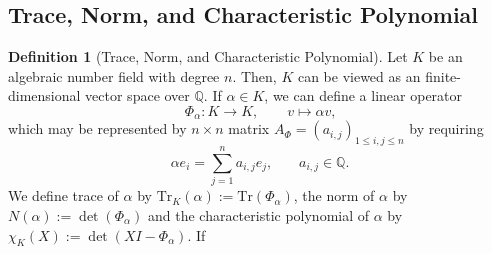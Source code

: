 \documentclass[a4paper]{book}
\theoremstyle{definition}
\newtheorem{definition}{Definition}[]
\begin{document}
\subsection{Trace, Norm, and Characteristic Polynomial}

\begin{defbox}
    \begin{definition}[Trace, Norm, and Characteristic Polynomial]
        Let \(K\) be an {\color{mathif}algebraic number field} with {\color{mathif}degree} \(n\). Then, \(K\) can be viewed as an {\color{mathif}finite-dimensional vector space} over \(\mathbb{Q}\). If \(\alpha \in K\), we can define a {\color{mathif}linear operator}
        \begin{equation*}
            \Phi_\alpha: K \longrightarrow K, \qquad v \mapsto \alpha v \text{,}
        \end{equation*}
        which may be represented by \(n \times n\) {\color{mathif}matrix} \(A_\Phi = (a_{i, j})_{1 \leq i, j \leq n}\) by requiring
        \begin{equation*}
            \alpha e_i = \sum_{j=1}^n a_{i, j} e_j\text{,} \qquad a_{i, j} \in \mathbb{Q} \text{.}
        \end{equation*}
        We define {\color{maththen}trace} of \(\alpha\) by \(\mathrm{Tr}_K(\alpha) := \mathrm{Tr}(\Phi_\alpha)\), the {\color{maththen}norm} of \(\alpha\) by \(N(\alpha) := \det(\Phi_\alpha)\) and the {\color{maththen}characteristic polynomial} of \(\alpha\) by \(\chi_K(X) := \det(XI - \Phi_\alpha)\). If 
    \end{definition}
\end{defbox}
\end{document}
